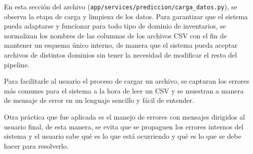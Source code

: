 En esta sección del archivo (\texttt{app/services/prediccion/carga\_datos.py}), se observa la etapa de carga y limpieza de los datos. Para garantizar que el sistema pueda adaptarse y funcionar para todo tipo de dominio de inventarios, se normalizan los nombres de las columnas de los archivos CSV con el fin de mantener un esquema único interno, de manera que el sistema pueda aceptar archivos de distintos dominios sin tener la necesidad de modificar el resto del pipeline.

Para facilitarle al usuario el proceso de cargar un archivo, se capturan los errores más comunes para el sistema a la hora de leer un CSV y se muestran a manera de mensaje de error en un lenguaje sencillo y fácil de entender.

Otra práctica que fue aplicada es el manejo de errores con mensajes dirigidos al usuario final, de esta manera, se evita que se propaguen los errores internos del sistema y el usuario sabe qué es lo que está ocurriendo y qué es lo que se debe hacer para resolverlo.
